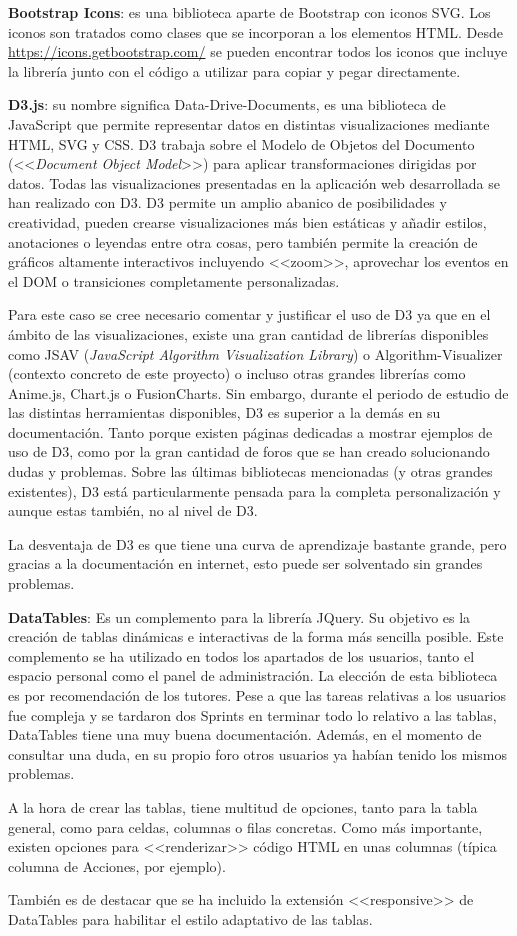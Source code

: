 \textbf{Bootstrap Icons}: es una biblioteca aparte de Bootstrap con iconos SVG.
Los iconos son tratados como clases que se incorporan a los elementos HTML.
Desde \url{https://icons.getbootstrap.com/} se pueden encontrar todos los iconos
que incluye la librería junto con el código a utilizar para copiar y pegar
directamente.

\textbf{D3.js}: su nombre significa Data-Drive-Documents, es una biblioteca de
JavaScript que permite representar datos en distintas visualizaciones mediante
HTML, SVG y CSS. D3 trabaja sobre el Modelo de Objetos del Documento
(<<\emph{Document Object Model}>>) para aplicar transformaciones dirigidas por
datos. Todas las visualizaciones presentadas en la aplicación web desarrollada
se han realizado con D3. D3 permite un amplio abanico de posibilidades y
creatividad, pueden crearse visualizaciones más bien estáticas y añadir estilos,
anotaciones o leyendas entre otra cosas, pero también permite la creación de
gráficos altamente interactivos incluyendo <<zoom>>, aprovechar los eventos en
el DOM o transiciones completamente personalizadas.

Para este caso se cree necesario comentar y justificar el uso de D3 ya que en el
ámbito de las visualizaciones, existe una gran cantidad de librerías disponibles
como JSAV (\emph{JavaScript Algorithm Visualization Library}) o
Algorithm-Visualizer (contexto concreto de este proyecto) o incluso otras
grandes librerías como Anime.js, Chart.js o FusionCharts. Sin embargo, durante
el periodo de estudio de las distintas herramientas disponibles, D3 es superior
a la demás en su documentación. Tanto porque existen páginas dedicadas a mostrar
ejemplos de uso de D3, como por la gran cantidad de foros que se han creado
solucionando dudas y problemas. Sobre las últimas bibliotecas mencionadas (y
otras grandes existentes), D3 está particularmente pensada para la completa
personalización y aunque estas también, no al nivel de D3.

La desventaja de D3 es que tiene una curva de aprendizaje bastante grande, pero
gracias a la documentación en internet, esto puede ser solventado sin grandes
problemas.

\textbf{DataTables}: Es un complemento para la librería JQuery. Su objetivo es
la creación de tablas dinámicas e interactivas de la forma más sencilla posible.
Este complemento se ha utilizado en todos los apartados de los usuarios, tanto
el espacio personal como el panel de administración. La elección de esta
biblioteca es por recomendación de los tutores. Pese a que las tareas relativas
a los usuarios fue compleja y se tardaron dos Sprints en terminar todo lo
relativo a las tablas, DataTables tiene una muy buena documentación. Además, en
el momento de consultar una duda, en su propio foro otros usuarios ya habían
tenido los mismos problemas.

A la hora de crear las tablas, tiene multitud de opciones, tanto para la tabla
general, como para celdas, columnas o filas concretas. Como más importante,
existen opciones para <<renderizar>> código HTML en unas columnas (típica
columna de Acciones, por ejemplo).

También es de destacar que se ha incluido la extensión <<responsive>> de
DataTables para habilitar el estilo adaptativo de las tablas.